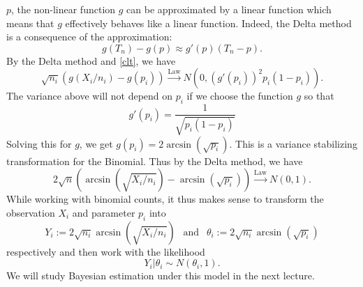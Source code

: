\documentclass{scrartcl}
\begin{document}
$p$, the non-linear function $g$ can be approximated by a linear
function which means that $g$ effectively behaves like a linear
function. Indeed, the Delta method is a consequence of the
approximation: 
\begin{equation*}
  g(T_n) - g(p) \approx g'(p) \left(T_n - p \right). 
\end{equation*}
By the Delta method and \eqref{clt}, we have
\begin{equation*}
  \sqrt{n_i} \left(g(X_i/n_i) - g(p_i) \right)
  \overset{\text{Law}}{\rightarrow} N(0, (g'(p_i))^2 p_i(1 -
  p_i)). 
\end{equation*}
The variance above will not depend on $p_i$ if we choose the
function $g$ so that
\begin{equation*}
  g'(p_i) = \frac{1}{\sqrt{p_i(1 - p_i)}}
\end{equation*}
Solving this for $g$, we get $g(p_i) = 2
\arcsin(\sqrt{p_i})$. This is a variance stabilizing transformation
for the Binomial. Thus by the Delta method, we have
\begin{equation*}
  2 \sqrt{n} \left(\arcsin(\sqrt{X_i/n_i}) - \arcsin(\sqrt{p_i})
  \right)   \overset{\text{Law}}{\rightarrow} N(0, 1). 
\end{equation*}
While working with binomial counts, it thus makes sense to transform
the observation $X_i$ and parameter $p_i$ into
\begin{equation*}
  Y_i := 2 \sqrt{n_i} \arcsin(\sqrt{X_i/n_i}) ~~ \text{ and } ~~
  \theta_i := 2 \sqrt{n_i} \arcsin(\sqrt{p_i})  
\end{equation*}
respectively and then work with the likelihood
\begin{equation*}
  Y_i | \theta_i \sim N(\theta_i, 1). 
\end{equation*}
We will study Bayesian estimation under this model in the next
lecture. 
\end{document}
